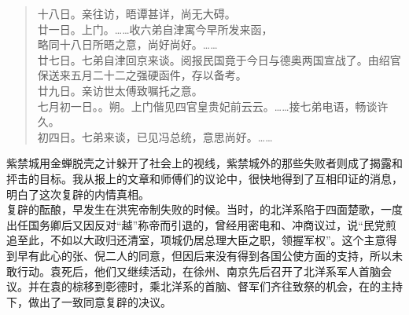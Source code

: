 \begin{quote}
十八日。亲往访，晤谭甚详，尚无大碍。\\

廿一日。上门。……收六弟自津寓今早所发来函，\\

略同十八日所晤之意，尚好尚好。……\\

廿七日。七弟自津回京来谈。阅报民国竟于今日与德奥两国宣战了。由绍官保送来五月二十二之强硬函件，存以备考。\\

廿九日。亲访世太傅致嘱托之意。\\

七月初一日。。朔。上门偕见四官皇贵妃前云云。……接七弟电语，畅谈许久。\\

初四日。七弟来谈，已见冯总统，意思尚好。……\\
\end{quote}

紫禁城用金蝉脱壳之计躲开了社会上的视线，紫禁城外的那些失败者则成了揭露和抨击的目标。我从报上的文章和师傅们的议论中，很快地得到了互相印证的消息，明白了这次复辟的内情真相。\\

复辟的酝酿，早发生在洪宪帝制失败的时候。当时，的北洋系陷于四面楚歌，一度出任国务卿后又因反对“越”称帝而引退的，曾经用密电和、冲商议过，说“民党煎追至此，不如以大政归还清室，项城仍居总理大臣之职，领握军权”。这个主意得到早有此心的张、倪二人的同意，但因后来没有得到各国公使方面的支持，所以未敢行动。袁死后，他们又继续活动，在徐州、南京先后召开了北洋系军人首脑会议。并在袁的棕移到彰德时，乘北洋系的首脑、督军们齐往致祭的机会，在的主持下，做出了一致同意复辟的决议。\\

